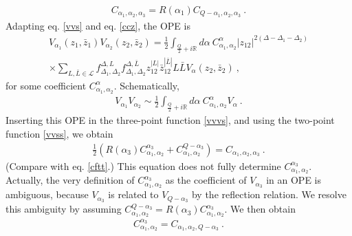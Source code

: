 \documentclass[12pt,a4paper,notitlepage]{report}
\numberwithin{equation}{section}
\theoremstyle{break}
\begin{document}
\begin{align}
 C_{\alpha_1,\alpha_2,\alpha_3} = R(\alpha_1) C_{Q-\alpha_1,\alpha_2,\alpha_3}\ .
\label{crc}
\end{align}
Adapting eq. \eqref{vvs} and eq. \eqref{ccz}, the OPE is  
\begin{multline}
 V_{\alpha_1}(z_1,\bar{z}_1) V_{\alpha_2}(z_2,\bar{z}_2) = \frac12 \int_{\frac{Q}{2}+i{\mathbb{R}}} d\alpha\ C_{\alpha_1,\alpha_2}^\alpha |z_{12}|^{2(\Delta-\Delta_1-\Delta_2)} 
\\ \times 
\sum_{L,\bar{L}\in \mathcal{L}} f_{\Delta_1,\Delta_2}^{\Delta,L} f_{\Delta_1,\Delta_2}^{\Delta,\bar{L}}z_{12}^{|L|} \bar{z}_{12}^{|\bar{L}|} L\bar{L} V_{\alpha}(z_2,\bar{z}_2) \ , 
\label{vvh}
\end{multline}
for some coefficient $C_{\alpha_1,\alpha_2}^\alpha$.
Schematically,
\begin{align}
 \boxed{V_{\alpha_1}V_{\alpha_2} \sim \frac12\int_{\frac{Q}{2}+i{\mathbb{R}}} d\alpha\ C_{\alpha_1,\alpha_2}^{\alpha} V_\alpha}\ .
\label{vvi}
\end{align}
Inserting this OPE in the three-point function \eqref{vvvs}, and using the two-point function \eqref{vvss}, we obtain
\begin{align}
 \frac12\left(R(\alpha_3)C_{\alpha_1,\alpha_2}^{\alpha_3} + C_{\alpha_1,\alpha_2}^{Q-\alpha_3}\right) = C_{\alpha_1,\alpha_2,\alpha_3}
\ . 
\label{hcc}
\end{align}
(Compare with eq. \eqref{cftt}.) 
This equation does not fully determine $C_{\alpha_1,\alpha_2}^{\alpha_3}$.
Actually, the very definition of $C_{\alpha_1,\alpha_2}^{\alpha_3}$ as the coefficient of $V_{\alpha_3}$ in an OPE is ambiguous, because $V_{\alpha_3}$ is related to $V_{Q-\alpha_3}$ by the reflection relation.
We  resolve this ambiguity by assuming $C_{\alpha_1,\alpha_2}^{Q-\alpha_3}=R(\alpha_3)C_{\alpha_1,\alpha_2}^{\alpha_3}$.
We then obtain
\begin{align}
 \boxed{C_{\alpha_1,\alpha_2}^{\alpha_3} = C_{\alpha_1,\alpha_2,Q-\alpha_3}}\ .
\label{cec}
\end{align}
\end{document}
